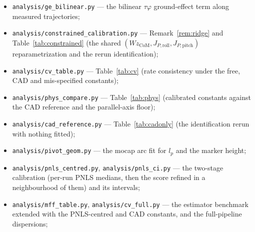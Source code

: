 \documentclass[10pt]{article}
\begin{document}
\begin{itemize}
\texttt{analysis/mcrit\_static\_figure.py},
\texttt{analysis/offset\_pivot\_based.py},
\texttt{analysis/offset\_ge\_variants.py},
\texttt{analysis/static\_residual\_split.py},
\texttt{analysis/static\_attribution.py} — Sec.~\ref{sec:static}
(static-threshold budget, arms, attribution limits,
Fig.~\ref{fig:static});
\item \texttt{analysis/ge\_bilinear.py} — the bilinear $\tau\varphi$
ground-effect term along measured trajectories;
\item \texttt{analysis/constrained\_calibration.py} —
Remark~\ref{rem:ridge} and Table~\ref{tab:constrained} (the shared
$(W z_{\mathrm{CoM}}, J_{P,\mathrm{roll}}, J_{P,\mathrm{pitch}})$
reparametrization and the rerun identification);
\item \texttt{analysis/cv\_table.py} — Table~\ref{tab:cv} (rate
consistency under the free, CAD and mis-specified constants);
\item \texttt{analysis/phys\_compare.py} — Table~\ref{tab:phys}
(calibrated constants against the CAD reference and the parallel-axis
floor);
\item \texttt{analysis/cad\_reference.py} — Table~\ref{tab:cadonly}
(the identification rerun with nothing fitted);
\item \texttt{analysis/pivot\_geom.py} — the mocap arc fit for $l_p$
and the marker height;
\item \texttt{analysis/pnls\_centred.py}, \texttt{analysis/pnls\_ci.py} —
the two-stage calibration (per-run PNLS medians, then the score refined
in a neighbourhood of them) and its intervals;
\item \texttt{analysis/mff\_table.py}, \texttt{analysis/cv\_full.py} —
the estimator benchmark extended with the PNLS-centred and CAD
constants, and the full-pipeline dispersions;
\end{itemize}
\endgroup
\end{document}
